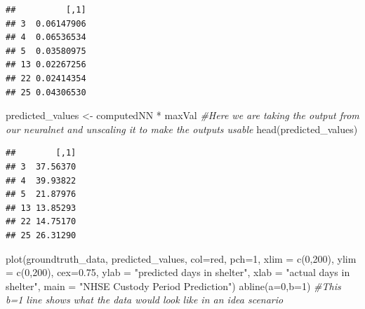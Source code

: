 \documentclass[
]{article}
\newenvironment{Shaded}{\begin{snugshade}}{\end{snugshade}}
\newcommand{\AttributeTok}[1]{\textcolor[rgb]{0.77,0.63,0.00}{#1}}
\newcommand{\CommentTok}[1]{\textcolor[rgb]{0.56,0.35,0.01}{\textit{#1}}}
\newcommand{\DecValTok}[1]{\textcolor[rgb]{0.00,0.00,0.81}{#1}}
\newcommand{\FloatTok}[1]{\textcolor[rgb]{0.00,0.00,0.81}{#1}}
\newcommand{\FunctionTok}[1]{\textcolor[rgb]{0.00,0.00,0.00}{#1}}
\newcommand{\NormalTok}[1]{#1}
\newcommand{\OtherTok}[1]{\textcolor[rgb]{0.56,0.35,0.01}{#1}}
\newcommand{\SpecialCharTok}[1]{\textcolor[rgb]{0.00,0.00,0.00}{#1}}
\newcommand{\StringTok}[1]{\textcolor[rgb]{0.31,0.60,0.02}{#1}}
\begin{document}
\begin{Shaded}
\end{Shaded}

\begin{verbatim}
##          [,1]
## 3  0.06147906
## 4  0.06536534
## 5  0.03580975
## 13 0.02267256
## 22 0.02414354
## 25 0.04306530
\end{verbatim}

\begin{Shaded}
\begin{Highlighting}[]
\NormalTok{predicted\_values }\OtherTok{\textless{}{-}}\NormalTok{ computedNN }\SpecialCharTok{*}\NormalTok{ maxVal }\CommentTok{\#Here we are taking the output from our neuralnet and unscaling it to make the outputs usable}
\FunctionTok{head}\NormalTok{(predicted\_values)}
\end{Highlighting}
\end{Shaded}

\begin{verbatim}
##        [,1]
## 3  37.56370
## 4  39.93822
## 5  21.87976
## 13 13.85293
## 22 14.75170
## 25 26.31290
\end{verbatim}

\begin{Shaded}
\begin{Highlighting}[]
\FunctionTok{plot}\NormalTok{(groundtruth\_data, predicted\_values, }\AttributeTok{col=}\StringTok{\textquotesingle{}red\textquotesingle{}}\NormalTok{, }\AttributeTok{pch=}\DecValTok{1}\NormalTok{, }
     \AttributeTok{xlim =} \FunctionTok{c}\NormalTok{(}\DecValTok{0}\NormalTok{,}\DecValTok{200}\NormalTok{), }\AttributeTok{ylim =} \FunctionTok{c}\NormalTok{(}\DecValTok{0}\NormalTok{,}\DecValTok{200}\NormalTok{), }\AttributeTok{cex=}\FloatTok{0.75}\NormalTok{, }
     \AttributeTok{ylab =} \StringTok{"predicted days in shelter"}\NormalTok{, }\AttributeTok{xlab =} \StringTok{"actual days in shelter"}\NormalTok{,}
     \AttributeTok{main =} \StringTok{"NHSE Custody Period Prediction"}\NormalTok{)}
\FunctionTok{abline}\NormalTok{(}\AttributeTok{a=}\DecValTok{0}\NormalTok{,}\AttributeTok{b=}\DecValTok{1}\NormalTok{) }\CommentTok{\#This b=1 line shows what the data would look like in an idea scenario}
\end{Highlighting}
\end{Shaded}
\end{document}
